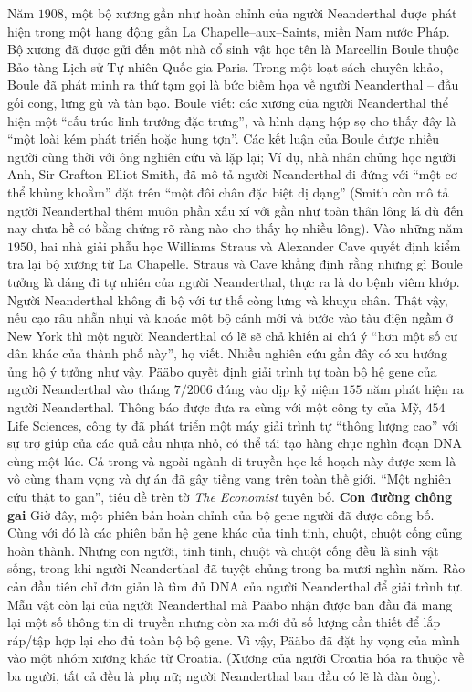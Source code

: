 \begin{multicols}{2}
	\vskip 0.1cm
	Năm $1908$, một bộ xương gần như hoàn chỉnh của người Neanderthal được phát hiện trong một hang động gần La Chapelle--aux--Saints, miền Nam nước Pháp. Bộ xương đã được gửi đến một nhà cổ sinh vật học tên là Marcellin Boule thuộc Bảo tàng Lịch sử Tự nhiên Quốc gia Paris. Trong một loạt sách chuyên khảo, Boule đã phát minh ra thứ tạm gọi là bức biếm họa về người Neanderthal -- đầu gối cong, lưng gù và tàn bạo. Boule viết: các xương của người Neanderthal thể hiện một “cấu trúc linh trưởng đặc trưng”, và hình dạng hộp sọ cho thấy đây là “một loài kém phát triển hoặc hung tợn”. Các kết luận của Boule được nhiều người cùng thời với ông nghiên cứu và lặp lại; Ví dụ, nhà nhân chủng học người Anh, Sir Grafton Elliot Smith, đã mô tả người Neanderthal đi đứng với “một cơ thể khùng khoằm” đặt trên “một đôi chân đặc biệt dị dạng” (Smith còn mô tả người Neanderthal thêm muôn phần xấu xí với gần như toàn thân lông lá dù đến nay chưa hề có bằng chứng rõ ràng nào cho thấy họ nhiều lông).
	\vskip 0.1cm
	Vào những năm $1950$, hai nhà giải phẫu học Williams Straus và Alexander Cave quyết định kiểm tra lại bộ xương từ La Chapelle. Straus và Cave khẳng định rằng những gì Boule tưởng là dáng đi tự nhiên của người Neanderthal, thực ra là do bệnh viêm khớp. Người Neanderthal không đi bộ với tư thế còng lưng và khuỵu chân. Thật vậy, nếu cạo râu nhẵn nhụi và khoác một bộ cánh mới và bước vào tàu điện ngầm ở New York thì một người Neanderthal có lẽ sẽ chả khiến ai chú ý “hơn một số cư dân khác của thành phố này”, họ viết. Nhiều nghiên cứu gần đây có xu hướng ủng hộ ý tưởng như vậy.
	\vskip 0.1cm
	Pääbo quyết định giải trình tự toàn bộ hệ gene của người Neanderthal vào tháng $7/2006$ đúng vào dịp kỷ niệm $155$ năm phát hiện ra người Neanderthal. Thông báo được đưa ra cùng với một công ty của Mỹ, $454$ Life Sciences, công ty đã phát triển một máy giải trình tự “thông lượng cao” với sự trợ giúp của các quả cầu nhựa nhỏ, có thể tái tạo hàng chục nghìn đoạn DNA cùng một lúc. Cả trong và ngoài ngành di truyền học kế hoạch này được xem là vô cùng tham vọng và dự án đã gây tiếng vang trên toàn thế giới. “Một nghiên cứu thật to gan”, tiêu đề trên tờ \textit{The Economist} tuyên bố.
	\vskip 0.1cm
	\textbf{\color{timhieukhoahoc}Con đường chông gai}
	\vskip 0.1cm
	Giờ đây, một phiên bản hoàn chỉnh của bộ gene người đã được công bố. Cùng với đó là các phiên bản hệ gene khác của tinh tinh, chuột, chuột cống cũng hoàn thành. Nhưng con người, tinh tinh, chuột và chuột cống đều là sinh vật sống, trong khi người Neanderthal đã tuyệt chủng trong ba mươi nghìn năm. Rào cản đầu tiên chỉ đơn giản là tìm đủ DNA của người Neanderthal để giải trình tự. Mẫu vật còn lại của người Neanderthal mà Pääbo nhận được ban đầu đã mang lại một số thông tin di truyền nhưng còn xa mới đủ số lượng cần thiết để lắp ráp/tập hợp lại cho đủ toàn bộ bộ gene. Vì vậy, Pääbo đã đặt hy vọng của mình vào một nhóm xương khác từ Croatia. (Xương của người Croatia hóa ra thuộc về ba người, tất cả đều là phụ nữ; người Neanderthal ban đầu có lẽ là đàn ông).

\end{multicols}
